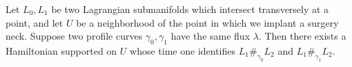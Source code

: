 
Let $L_0, L_1$ be two Lagrangian submanifolds which intersect transversely at a point, and let $U$ be a neighborhood of the point in which we implant a surgery neck. Suppose two profile curves $\gamma_0, \gamma_1$ have the same flux $\lambda$.
Then there exists a Hamiltonian supported on $U$ whose time one identifies $L_1\#_{\gamma_0} L_2$ and $L_1\#_{\gamma_1} L_2$.
